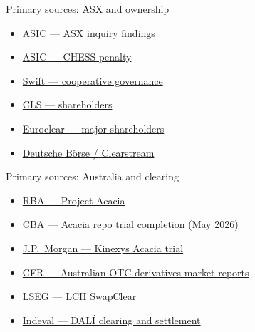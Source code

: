 \documentclass[aspectratio=169,12pt]{beamer}
\newcommand{\verytightitems}{\setlength{\itemsep}{0.22em}\setlength{\parskip}{0pt}}
\begin{document}
\begin{frame}{Primary sources: ASX and ownership}
  \fontsize{8.1}{9.7}\selectfont
  \begin{itemize}\verytightitems
    \item \href{https://www.asic.gov.au/about-asic/news-centre/find-a-media-release/2026-releases/26-059mr-asic-publishes-asx-inquiry-panel-final-report-and-acknowledges-observations/}{ASIC --- ASX inquiry findings}
    \item \href{https://www.asic.gov.au/about-asic/news-centre/find-a-media-release/2026-releases/26-143mr-asx-ordered-to-pay-20-5-million-penalty-for-misleading-conduct-relating-to-chess-replacement-project/}{ASIC --- CHESS penalty}
    \item \href{https://www.swift.com/about-us/organisation-governance/swift-governance}{Swift --- cooperative governance}
    \item \href{https://www.cls-group.com/about/shareholders/}{CLS --- shareholders}
    \item \href{https://www.euroclear.com/investorrelations/en/top-10-shareholders-Euroclear-Holding-SA-NV.html}{Euroclear --- major shareholders}
    \item \href{https://deutsche-boerse.com/dbg-en/media/news-stories/press-releases/Clearstream-Unveils-Next-Generation-Digital-Securities-Infrastructure-5318978}{Deutsche B\"orse / Clearstream}
  \end{itemize}
\end{frame}

\begin{frame}{Primary sources: Australia and clearing}
  \fontsize{8.1}{9.7}\selectfont
  \begin{itemize}\verytightitems
    \item \href{https://www.rba.gov.au/media-releases/2024/mr-24-25.html}{RBA --- Project Acacia}
    \item \href{https://www.commbank.com.au/articles/newsroom/2026/05/rba-wholesale-funding-markets-trial.html}{CBA --- Acacia repo trial completion (May 2026)}
    \item \href{https://www.jpmorgan.com/payments/newsroom/kinexys-project-acacia-tokenization-trial-australia}{J.P.\ Morgan --- Kinexys Acacia trial}
    \item \href{https://www.cfr.gov.au/publications/policy-statements-and-other-reports/2013/report-on-the-australian-otc-derivatives-market-july/}{CFR --- Australian OTC derivatives market reports}
    \item \href{https://www.lseg.com/en/post-trade/clearing/lch-services/swapclear}{LSEG --- LCH SwapClear}
    \item \href{https://www.indeval.com.mx/en/product?p=clearing-settlement}{Indeval --- DAL\'I clearing and settlement}
  \end{itemize}
\end{frame}
\end{document}
